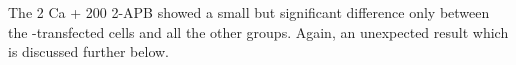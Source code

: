 

The 2 Ca + 200 2-APB showed a small but significant difference only between the \stim{}-transfected  cells and all the other groups. Again, an unexpected result which is discussed further below.  








